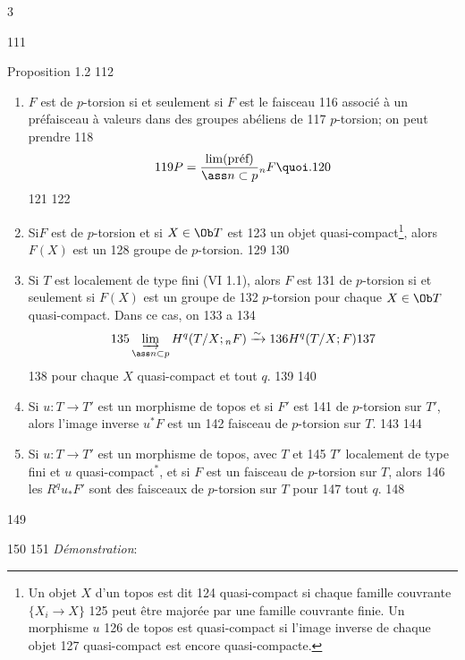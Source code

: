 3	\documentclass[10pt]{../fichiers-configuration-latex/smfart}
\begin{document}
   111	\begin{enonce*}{Proposition 1.2}
   112	\begin{enumerate}
   113	\renewcommand{\theenumi}{\roman{enumi}}
   114	\renewcommand{\labelenumi}{(\theenumi)}
   115	\item $F$ est de $p$-torsion si et seulement si $F$ est le faisceau
   116	  associé à un préfaisceau à valeurs dans des groupes abéliens de
   117	  $p$-torsion; on peut prendre
   118	$$
   119	P=\frac{\lim(\text{\rm préf})}{\ass n\subset p} {}_nF{\quoi}.
   120	$$
   121	
   122	\item Si\pageoriginale $F$ est de $p$-torsion et si $X\in \Ob T$ est
   123	  un objet quasi-compact\footnote[1]{Un objet $X$ d'un topos est dit
   124	  quasi-compact si chaque famille couvrante $\{X_i\rightarrow X\}$
   125	  peut être majorée par une famille couvrante finie. Un morphisme $u$
   126	  de topos est quasi-compact si l'image inverse de chaque objet
   127	  quasi-compact est encore quasi-compacte.}, alors $F(X)$ est un
   128	  groupe de $p$-torsion.
   129	
   130	\item Si $T$ est localement de type fini {\rm (VI 1.1)}, alors $F$ est
   131	  de $p$-torsion si et seulement si $F(X)$ est un groupe de
   132	  $p$-torsion pour chaque $X\in \Ob T$ quasi-compact. Dans ce cas, on
   133	  a
   134	$$
   135	\varinjlim_{\ass n\subset p} H^q(T/X; {}_nF)\xrightarrow{\sim}
   136	H^q(T/X;F)
   137	$$
   138	pour chaque $X$ quasi-compact et tout $q$.
   139	
   140	\item Si $u:T\rightarrow T'$ est un morphisme de topos et si $F'$ est
   141	  de $p$-torsion sur $T'$, alors l'image inverse $u^{\ast}F$ est un
   142	  faisceau de $p$-torsion sur $T$.
   143	
   144	\item Si $u:T\rightarrow T'$ est un morphisme de topos, avec $T$ et
   145	  $T'$ localement de type fini et $u$ quasi-compact${}^\ast$, et si $F$ est un faisceau de $p$-torsion sur $T$, alors
   146	  les $R^qu_{\ast}F'$ sont des faisceaux de $p$-torsion sur $T$ pour
   147	  tout $q$.
   148	\end{enumerate}
   149	\end{enonce*}
   150	
   151		\emph{Démonstration}:
\end{document}

